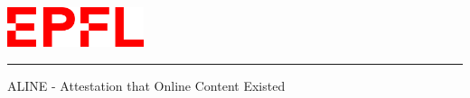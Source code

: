 
%        




\newcommand{\logoepfl}[0]{
  \begin{center}
    \includegraphics[width=4cm]{logo_epfl.png}
  \end{center}
  \vspace{0.3cm}
  \hrule
}
\newcommand{\project}[1]{
  \begin{center}
    \large{#1}
  \end{center}
  \vspace{1cm}
}
\newcommand{\department}[1]{
  \begin{center}
    \large{#1}
  \end{center}
}
\newcommand{\lab}[1]{
  \begin{center}
    \large{#1}
  \end{center}
}
\newcommand{\supervisor}[3]{
  \begin{center}
    \begin{normalsize}{
        \bf #1}\\#2\\#3
    \end{normalsize}
  \end{center}
}
\renewcommand{\author}[1]{
  \begin{center}
    \Large{#1}
  \end{center}
  \vspace{0.5cm}
}
\renewcommand{\title}[1]{
  \vspace{3cm}
  \begin{center}
    \huge{#1}
  \end{center}
  \vspace{1.7cm}
}
\renewcommand{\date}[2]{
  \begin{center}
    \normalsize{#1 #2}
  \end{center}
  \vspace{0.5cm}
}


\thispagestyle{empty}


  \logoepfl
  
  \title{ALINE - Attestation that Online Content Existed}
  
